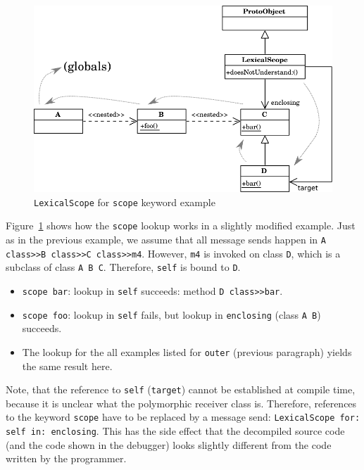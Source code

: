 \begin{figure}[!htp]
	\includegraphics[scale=1]{lexical_scope.pdf}
	\centering
	\caption{\texttt{LexicalScope} for \texttt{scope} keyword example}
	\label{impl:lex_scope}
\end{figure}

Figure~\ref{impl:lex_scope} shows how the \texttt{scope} lookup works in a slightly modified example. Just as in the previous example, we assume that all message sends happen in \texttt{A class>>B class>>C class>>m4}. However, \texttt{m4} is invoked on class \texttt{D}, which is a subclass of class \texttt{A B C}. Therefore, \texttt{self} is bound to \texttt{D}.

\begin{itemize}
	\item \texttt{scope bar}: lookup in \texttt{self} succeeds: method \texttt{D class>>bar}.
	\item \texttt{scope foo}: lookup in \texttt{self} fails, but lookup in \texttt{enclosing} (class \texttt{A B}) succeeds.
	\item The lookup for the all examples listed for \texttt{outer} (previous paragraph) yields the same result here.
\end{itemize}

Note, that the reference to \texttt{self} (\texttt{target}) cannot be established at compile time, because it is unclear what the polymorphic receiver class is. Therefore, references to the keyword \texttt{scope} have to be replaced by a message send: \texttt{LexicalScope for: self in: enclosing}. This has the side effect that the decompiled source code (and the code shown in the debugger) looks slightly different from the code written by the programmer.

